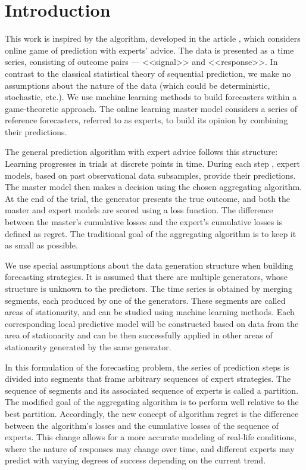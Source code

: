 \documentclass[12pt, twoside]{article}
\begin{document}
\maketitle

\section{Introduction}
This work is inspired by the algorithm, developed in the article \cite{article}, which considers online game of prediction with experts' advice. The data is presented as a time series, consisting of outcome pairs --- <<signal>> and <<response>>. 
In contrast to the classical statistical theory of sequential prediction, we make no assumptions about the nature of the data (which could be deterministic, stochastic, etc.). 
We use machine learning methods to build forecasters within a game-theoretic approach.
The online learning master model considers a series of reference forecasters, referred to as experts, to build its opinion by combining their predictions.

The general prediction algorithm with expert advice follows this structure:
Learning progresses in trials at discrete points in time. 
During each step , expert models, based on past observational data subsamples, provide their predictions. 
The master model then makes a decision using the chosen aggregating algorithm. 
At the end of the trial, the generator presents the true outcome, and both the master and expert models are scored using a loss function. 
The difference between the master's cumulative losses and the expert's cumulative losses is defined as regret.
The traditional goal of the aggregating algorithm is to keep it as small as possible.

We use special assumptions about the data generation structure when building forecasting strategies. 
It is assumed that there are multiple generators, whose structure is unknown to the predictors. 
The time series is obtained by merging segments, each produced by one of the generators. 
These segments are called areas of stationarity, and can be studied using machine learning methods.
Each corresponding local predictive model will be constructed based on data from the area of stationarity and can be then successfully applied in other areas of stationarity generated by the same generator.

In this formulation of the forecasting problem, the series of prediction steps is divided into segments that frame arbitrary sequences of expert strategies. 
The sequence of segments and its associated sequence of experts is called a partition. 
The modified goal of the aggregating algorithm is to perform well relative to the best partition. 
Accordingly, the new concept of algorithm regret is the difference between the algorithm's losses and the cumulative losses of the sequence of experts. 
This change allows for a more accurate modeling of real-life conditions, where the nature of responses may change over time, and different experts may predict with varying degrees of success depending on the current trend. 
\end{document}
